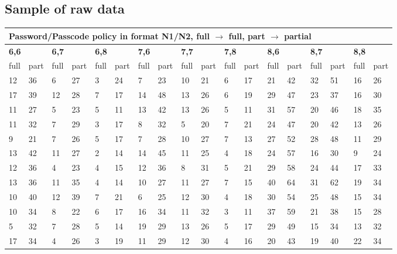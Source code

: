 \documentclass[british,10pt,a4paper]{article}
\begin{document}
\begin{appendices}
	\subsection{Sample of raw data}
	\label{app:raw_data}
	\begin{longtable}{|l|l|l|l|l|l|l|l|l|l|l|l|l|l|l|l|l|l|}
	\hline
	\multicolumn{18}{|l|}{\textbf{Password/Passcode policy in format N1/N2, full $\rightarrow$ full, part $\rightarrow$ partial}} \\ \hline
	\multicolumn{2}{|l|}{\textbf{6,6}} & \multicolumn{2}{l|}{\textbf{6,7}} & \multicolumn{2}{l|}{\textbf{6,8}} & \multicolumn{2}{l|}{\textbf{7,6}} & \multicolumn{2}{l|}{\textbf{7,7}} & \multicolumn{2}{l|}{\textbf{7,8}} & \multicolumn{2}{l|}{\textbf{8,6}} & \multicolumn{2}{l|}{\textbf{8,7}} & \multicolumn{2}{l|}{\textbf{8,8}} \\ \hline
	full & part & full & part & full & part & full & part & full & part & full & part & full & part & full & part & full & part \\ \hline
	12 & 36 & 6 & 27 & 3 & 24 & 7 & 23 & 10 & 21 & 6 & 17 & 21 & 42 & 32 & 51 & 16 & 26 \\ \hline
	17 & 39 & 12 & 28 & 7 & 17 & 14 & 48 & 13 & 26 & 6 & 19 & 29 & 47 & 23 & 37 & 16 & 30 \\ \hline
	11 & 27 & 5 & 23 & 5 & 11 & 13 & 42 & 13 & 26 & 5 & 11 & 31 & 57 & 20 & 46 & 18 & 35 \\ \hline
	11 & 32 & 7 & 29 & 3 & 17 & 8 & 32 & 5 & 20 & 7 & 21 & 24 & 47 & 20 & 42 & 13 & 26 \\ \hline
	9 & 21 & 7 & 26 & 5 & 17 & 7 & 28 & 10 & 27 & 7 & 13 & 27 & 52 & 28 & 48 & 11 & 29 \\ \hline
	13 & 42 & 11 & 27 & 2 & 14 & 14 & 45 & 11 & 25 & 4 & 18 & 24 & 57 & 16 & 30 & 9 & 24 \\ \hline
	12 & 36 & 4 & 23 & 4 & 15 & 12 & 36 & 8 & 31 & 5 & 21 & 29 & 58 & 24 & 44 & 17 & 33 \\ \hline
	13 & 36 & 11 & 35 & 4 & 14 & 10 & 27 & 11 & 27 & 7 & 15 & 40 & 64 & 31 & 62 & 19 & 34 \\ \hline
	10 & 40 & 12 & 39 & 7 & 21 & 6 & 25 & 12 & 30 & 4 & 18 & 30 & 54 & 25 & 48 & 15 & 34 \\ \hline
	10 & 34 & 8 & 22 & 6 & 17 & 16 & 34 & 11 & 32 & 3 & 11 & 37 & 59 & 21 & 38 & 15 & 28 \\ \hline
	5 & 32 & 7 & 28 & 5 & 14 & 19 & 29 & 13 & 26 & 5 & 17 & 29 & 49 & 15 & 34 & 13 & 32 \\ \hline
	17 & 34 & 4 & 26 & 3 & 19 & 11 & 29 & 12 & 30 & 4 & 16 & 20 & 43 & 19 & 40 & 22 & 34 \\ \hline

\end{longtable}
\end{appendices}
\end{document}
